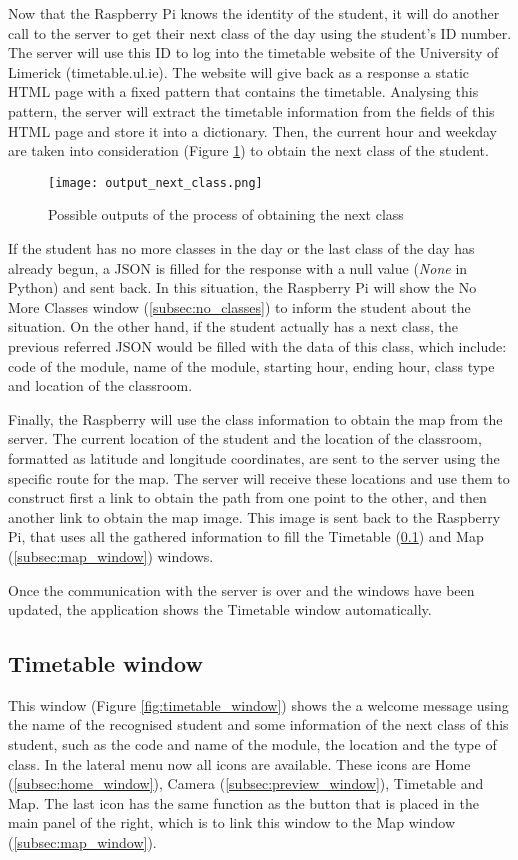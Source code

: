 	Now that the Raspberry Pi knows the identity of the student, it will do another call to the server to get their next class of the day using the student's ID number. The server will use this ID to log into the timetable website of the University of Limerick (timetable.ul.ie). The website will give back as a response a static HTML page with a fixed pattern that contains the timetable. Analysing this pattern, the server will extract the timetable information from the fields of this HTML page and store it into a dictionary. Then, the current hour and weekday are taken into consideration (Figure \ref{fig:output_next_class}) to obtain the next class of the student.   

	\begin{figure}[!ht]
		\centering
		\texttt{[image: output\_next\_class.png]}
		\caption{Possible outputs of the process of obtaining the next class}
		\label{fig:output_next_class}
	\end{figure}

	If the student has no more classes in the day or the last class of the day has already begun, a JSON is filled for the response with a null value (\textit{None} in Python) and sent back. In this situation, the Raspberry Pi will show the No More Classes window (\ref{subsec:no_classes}) to inform the student about the situation. On the other hand, if the student actually has a next class, the previous referred JSON would be filled with the data of this class, which include: code of the module, name of the module, starting hour, ending hour, class type and location of the classroom.

	Finally, the Raspberry will use the class information to obtain the map from the server. The current location of the student and the location of the classroom, formatted as latitude and longitude coordinates, are sent to the server using the specific route for the map. The server will receive these locations and use them to construct first a link to obtain the path from one point to the other, and then another link to obtain the map image. This image is sent back to the Raspberry Pi, that uses all the gathered information to fill the Timetable (\ref{subsec:timetable_window}) and Map (\ref{subsec:map_window}) windows.

	Once the communication with the server is over and the windows have been updated, the application shows the Timetable window automatically.

	\subsection{Timetable window}
	\label{subsec:timetable_window}
	This window (Figure \ref{fig:timetable_window}) shows the a welcome message using the name of the recognised student and some information of the next class of this student, such as the code and name of the module, the location and the type of class. In the lateral menu now all icons are available. These icons are Home (\ref{subsec:home_window}), Camera (\ref{subsec:preview_window}), Timetable and Map. The last icon has the same function as the button that is placed in the main panel of the right, which is to link this window to the Map window (\ref{subsec:map_window}). 

